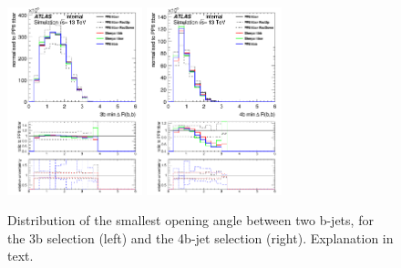 \begin{figure}[!htb]
\centering
\includegraphics[width=0.35\textwidth]{Plots/ttbb/hisgenEvt_Dr_MinDeltaRGenBJets_4j3t__div}
\includegraphics[width=0.35\textwidth]{Plots/ttbb/hisgenEvt_Dr_MinDeltaRGenBJets_4j4t__div}
  \caption{Distribution of the smallest opening angle between two b-jets, for the 3b selection (left) and the 4b-jet selection (right). Explanation in text. \label{ttbb:mindR}}
\end{figure}

